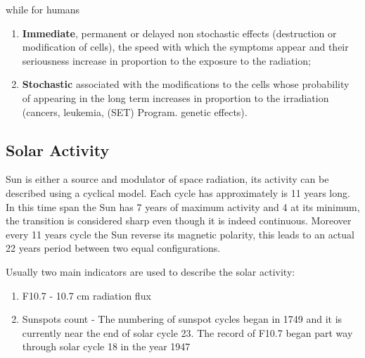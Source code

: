 \documentclass[./dissertation.tex]{subfiles}
\begin{document}
while for humans

\begin{enumerate}
    \item \textbf{Immediate}, permanent or delayed  non  stochastic  effects (destruction or modification of cells), the speed with which the symptoms appear  and  their  seriousness  increase in proportion to the exposure to the radiation;
    \item \textbf {Stochastic}   associated  with the modifications to the cells whose probability of appearing in the long term  increases in proportion to  the irradiation  (cancers,  leukemia, (SET) Program. genetic effects).
\end{enumerate}

\subsection{Solar Activity}
Sun is either a source and modulator of space radiation, its activity can be described using a cyclical model. Each cycle has approximately is 11 years long. In this time span the Sun has 7 years of maximum activity and 4 at its minimum, the transition is considered sharp even though it is indeed continuous. Moreover every 11 years cycle the Sun reverse its magnetic polarity, this leads to an actual 22 years period between two equal configurations.

Usually two main indicators are used to describe the solar activity:
\begin{enumerate}
    \item F10.7 - 10.7 cm radiation flux
    \item Sunspots count - The numbering of sunspot
cycles began in 1749 and it is currently near the end of solar
cycle 23. The record of F10.7 began part way through solar
cycle 18 in the year 1947
\end{enumerate}
\end{document}
